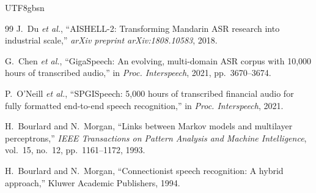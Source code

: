 \documentclass[12pt,a4paper]{article}
\newcommand{\etal}{\textit{et al.}}
\begin{document}
\begin{CJK}{UTF8}{gbsn}
\begin{thebibliography}{99}
J.~Du \etal,
``AISHELL-2: Transforming Mandarin ASR research into industrial scale,''
\textit{arXiv preprint arXiv:1808.10583}, 2018.

G.~Chen \etal,
``GigaSpeech: An evolving, multi-domain ASR corpus with 10,000 hours of transcribed audio,''
in \textit{Proc. Interspeech}, 2021, pp.~3670--3674.

P.~O'Neill \etal,
``SPGISpeech: 5,000 hours of transcribed financial audio for fully formatted end-to-end speech recognition,''
in \textit{Proc. Interspeech}, 2021.

H.~Bourlard and N.~Morgan,
``Links between Markov models and multilayer perceptrons,''
\textit{IEEE Transactions on Pattern Analysis and Machine Intelligence}, vol.~15, no.~12, pp.~1161--1172, 1993.

H.~Bourlard and N.~Morgan,
``Connectionist speech recognition: A hybrid approach,''
Kluwer Academic Publishers, 1994.

\end{thebibliography}

\end{CJK}
\end{document}
